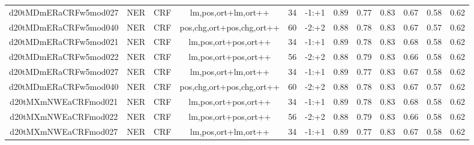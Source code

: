 \documentclass[a4paper]{article}
\begin{document}
\begin{landscape}
\begin{center}
\begin{tabular}{ |c|c|c|c|c|c|c|c|c|c|c|c|}
 
 	
 	\small{ d20tMDmERaCRFw5mod027 } & \small{ NER} & \small{  CRF }  & lm,pos,ort+lm,ort++  &  34 &  \small{  -1:+1 }  &  0.89 & 0.77 & 0.83  &  0.67 & 0.58 & 0.62 \\
 	

 
 	
 	\small{ d20tMDmERaCRFw5mod040 } & \small{ NER} & \small{  CRF }  & pos,chg,ort+pos,chg,ort++  &  60 &  \small{  -2:+2 }  &  0.88 & 0.78 & 0.83  &  0.67 & 0.57 & 0.62 \\
 	

 
 	
 	\small{ d20tMDmERaCRFw5mod021 } & \small{ NER} & \small{  CRF }  & lm,pos,ort+pos,ort++  &  34 &  \small{  -1:+1 }  &  0.89 & 0.78 & 0.83  &  0.68 & 0.58 & 0.62 \\
 	

 
 	
 	\small{ d20tMDmERaCRFw5mod022 } & \small{ NER} & \small{  CRF }  & lm,pos,ort+pos,ort++  &  56 &  \small{  -2:+2 }  &  0.88 & 0.79 & 0.83  &  0.66 & 0.58 & 0.62 \\
 	

 
 	
 	\small{ d20tMDmERaCRFw5mod027 } & \small{ NER} & \small{  CRF }  & lm,pos,ort+lm,ort++  &  34 &  \small{  -1:+1 }  &  0.89 & 0.77 & 0.83  &  0.67 & 0.58 & 0.62 \\
 	

 
 	
 	\small{ d20tMDmERaCRFw5mod040 } & \small{ NER} & \small{  CRF }  & pos,chg,ort+pos,chg,ort++  &  60 &  \small{  -2:+2 }  &  0.88 & 0.78 & 0.83  &  0.67 & 0.57 & 0.62 \\
 	

 
 	
 	\small{ d20tMXmNWEaCRFmod021 } & \small{ NER} & \small{  CRF }  & lm,pos,ort+pos,ort++  &  34 &  \small{  -1:+1 }  &  0.89 & 0.78 & 0.83  &  0.68 & 0.58 & 0.62 \\
 	

 
 	
 	\small{ d20tMXmNWEaCRFmod022 } & \small{ NER} & \small{  CRF }  & lm,pos,ort+pos,ort++  &  56 &  \small{  -2:+2 }  &  0.88 & 0.79 & 0.83  &  0.66 & 0.58 & 0.62 \\
 	

 
 	
 	\small{ d20tMXmNWEaCRFmod027 } & \small{ NER} & \small{  CRF }  & lm,pos,ort+lm,ort++  &  34 &  \small{  -1:+1 }  &  0.89 & 0.77 & 0.83  &  0.67 & 0.58 & 0.62 \\
 	


\end{tabular}
\end{center}
\end{landscape}
\end{document}
